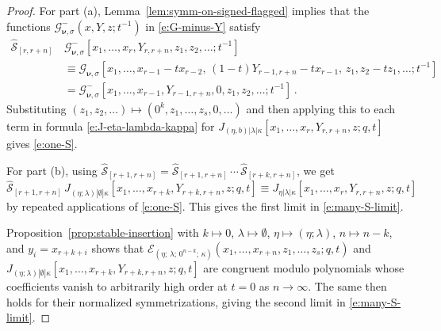 \documentclass[12pt]{amsart}
\theoremstyle{definition}
\theoremstyle{remark}
\newcommand{\nubold}{{\boldsymbol \nu }}
\newcommand{\Ecal}{{\mathcal E}}
\newcommand{\Gcal}{{\mathcal G}}
\newcommand{\Scal}{{\mathcal S}}
\newcommand{\hsym}{\widehat{\Scal}}    %
\newcommand{\Jns}{J}           %
\begin{document}
\begin{proof}
For part (a), Lemma~\ref{lem:symm-on-signed-flagged} implies that the
functions $\Gcal ^{-}_{\nubold ,\sigma }(x,Y,z; t^{-1})$ in
\eqref{e:G-minus-Y} satisfy
\begin{equation}\label{e:symm-G-minus-Y}
\begin{aligned}
\hsym _{[r,r+n]}\, &\Gcal ^{-}_{\nubold ,\sigma
}[x_{1},\ldots,x_{r},Y_{r,r+n},z_{1},z_{2},\ldots ; t^{-1}]\\
& \equiv \Gcal _{\nubold ,\sigma }[x_{1}, \ldots, x_{r-1}-t x_{r-2},\,
(1-t)Y_{r-1,r+n} - t x_{r-1},\, z_{1}, z_{2} - t z_{1},\ldots ;
t^{-1}]\\
& = \Gcal ^{-}_{\nubold ,\sigma
}[x_{1},\ldots,x_{r-1},Y_{r-1,r+n},0,z_{1}, z_{2},\ldots ; t^{-1}]\, .
\end{aligned}
\end{equation}
Substituting $(z_{1},z_{2},\ldots )\mapsto
(0^{k},z_{1},\ldots,z_{s},0,\ldots )$ and then applying this to each
term in formula \eqref{e:J-eta-lambda-kappa} for $\Jns _{(\eta
,b)|\lambda |\kappa }[x_{1},\ldots,x_{r}, Y_{r,r+n}, z; q,t]$ gives
\eqref{e:one-S}.

For part (b), using $\hsym _{[r+1,r+n]} = \hsym _{[r+1,r+n]}\,
\cdots \, \hsym _{[r+k,r+n]}$, we get 
\begin{equation}\label{e:repeat-one-S}
\hsym _{[r+1,r+n]}\, \Jns _{(\eta ;\lambda )|\emptyset |\kappa
}[x_{1},\ldots,x_{r+k}, Y_{r+k,r+n},z; q,t] \equiv \Jns _{\eta
|\lambda|\kappa }[x_{1},\ldots, x_{r}, Y_{r,r+n},z; q,t]
\end{equation}
by repeated applications of \eqref{e:one-S}.  This gives the first
limit in \eqref{e:many-S-limit}.

Proposition~\ref{prop:stable-insertion} with $k\mapsto 0$, $\lambda
\mapsto \emptyset $, $\eta \mapsto (\eta ;\lambda )$, $n \mapsto n-k$,
and $y_{i} = x_{r+k+i}$ shows that $\Ecal _{(\eta ;\, \lambda ;\,
0^{n-k};\, \kappa )}(x_{1},\ldots, x_{r+n},z_{1},\ldots,z_{s}; q,t) $
and $\Jns _{(\eta ;\lambda ) |\emptyset
|\kappa}[x_{1},\ldots,x_{r+k},Y_{r+k,r+n},z; q,t]$ are congruent
modulo polynomials whose coefficients vanish to arbitrarily high order
at $t=0$ as $n\rightarrow \infty $.  The same then holds for their
normalized symmetrizations, giving the second limit in
\eqref{e:many-S-limit}.
\end{proof}
\end{document}
